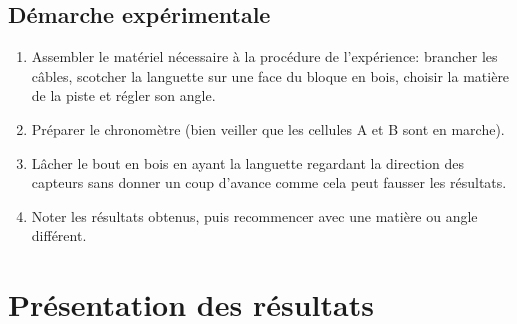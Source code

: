 \documentclass[twoside,twocolumn]{article}
\begin{document}
\subsection{Démarche expérimentale}
\begin{enumerate}
\item Assembler le matériel nécessaire à la procédure de l’expérience: brancher les câbles, scotcher la languette sur une face du bloque en bois, choisir la matière de la piste et régler son angle.
\item Préparer le chronomètre (bien veiller que les cellules A et B sont en marche).
\item Lâcher le bout en bois en ayant la languette regardant la direction des capteurs sans donner un coup d’avance comme cela peut fausser les résultats.
\item Noter les résultats obtenus, puis recommencer avec une matière ou angle différent.
\end{enumerate}


\section{Présentation des résultats}
\end{document}
